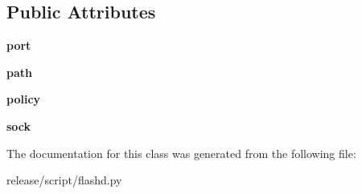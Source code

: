 \subsection*{Public Attributes}
\begin{DoxyCompactItemize}
\item 
\hypertarget{classflashd_1_1policy__server_a12042e326d6d4d264d8fe549325d8d3d}{
{\bfseries port}}
\label{classflashd_1_1policy__server_a12042e326d6d4d264d8fe549325d8d3d}

\item 
\hypertarget{classflashd_1_1policy__server_a9ec14a44cef258eaa09070ff57aa79a3}{
{\bfseries path}}
\label{classflashd_1_1policy__server_a9ec14a44cef258eaa09070ff57aa79a3}

\item 
\hypertarget{classflashd_1_1policy__server_aee146bf9f26dbaa56847eec96b5d5395}{
{\bfseries policy}}
\label{classflashd_1_1policy__server_aee146bf9f26dbaa56847eec96b5d5395}

\item 
\hypertarget{classflashd_1_1policy__server_abe61bb235e6f59eed07ae915d84f1a9e}{
{\bfseries sock}}
\label{classflashd_1_1policy__server_abe61bb235e6f59eed07ae915d84f1a9e}

\end{DoxyCompactItemize}


The documentation for this class was generated from the following file:\begin{DoxyCompactItemize}
\item 
release/script/flashd.py\end{DoxyCompactItemize}
